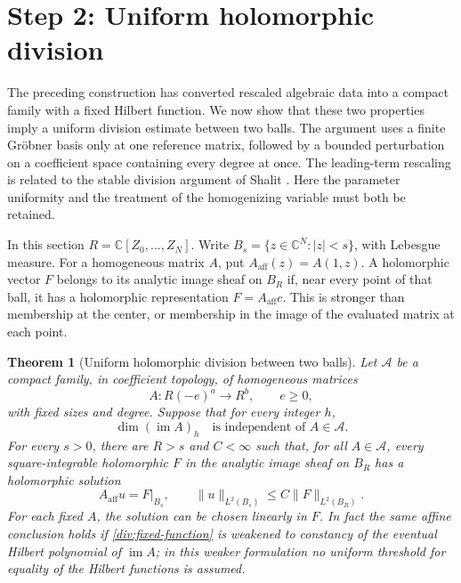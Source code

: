 \documentclass[11pt,reqno]{amsart}
\numberwithin{equation}{section}
\newtheorem{thmC}{Theorem}\renewcommand{\thethmC}{C}
\theoremstyle{definition}
\theoremstyle{remark}
\begin{document}
\section{Step 2: Uniform holomorphic division}
\label{sec:division}

The preceding construction has converted rescaled algebraic data into
a compact family with a fixed Hilbert function. We now show that these
two properties imply a uniform division estimate between two balls.
The argument uses a finite Gr\"obner basis only at one reference
matrix, followed by a bounded perturbation on a coefficient space
containing every degree at once. The leading-term rescaling is related
to the stable division argument of Shalit
\cite[Proposition~3.2, Lemmas~3.4--3.5, and Theorem~3.6]{ShalitDivision}.
Here the parameter uniformity and the treatment of the homogenizing
variable must both be retained.

In this section \(R=\mathbb C[Z_0,\ldots,Z_N]\). Write \(B_s=\{z\in\mathbb C^N:|z|<s\}\), with Lebesgue measure.
For a homogeneous matrix \(A\), put \(A_{\mathrm{aff}}(z)=A(1,z)\).
A holomorphic vector \(F\) belongs to its analytic image sheaf on
\(B_R\) if, near every point of that ball, it has a holomorphic
representation \(F=A_{\mathrm{aff}}c\). This is stronger than
membership at the center, or membership in the image of the evaluated
matrix at each point.

\begin{thmC}[Uniform holomorphic division between two balls]
\label{div:uniform}
Let \(\mathcal A\) be a compact family, in coefficient topology, of
homogeneous matrices
\[
 A:R(-e)^a\longrightarrow R^b,
 \qquad e\geq0,
\]
with fixed sizes and degree. Suppose that for every integer \(h\),
\begin{equation}
 \dim(\operatorname{im}A)_h
 \quad\text{is independent of }A\in\mathcal A.
 \label{div:fixed-function}
\end{equation}
For every \(s>0\), there are \(R>s\) and \(C<\infty\) such that, for
all \(A\in\mathcal A\), every square-integrable holomorphic \(F\) in
the analytic image sheaf on \(B_R\) has a holomorphic solution
\[
 A_{\mathrm{aff}}u=F|_{B_s},
 \qquad
 \|u\|_{L^2(B_s)}\leq C\|F\|_{L^2(B_R)}.
 \tag{\(\dagger\)}
\]
For each fixed $A$, the solution can be chosen linearly in $F$.
In fact the same affine conclusion holds if \eqref{div:fixed-function}
is weakened to constancy of the eventual Hilbert polynomial of
$\operatorname{im}A$; in this weaker formulation no uniform threshold
for equality of the Hilbert functions is assumed.
\end{thmC}
\end{document}

